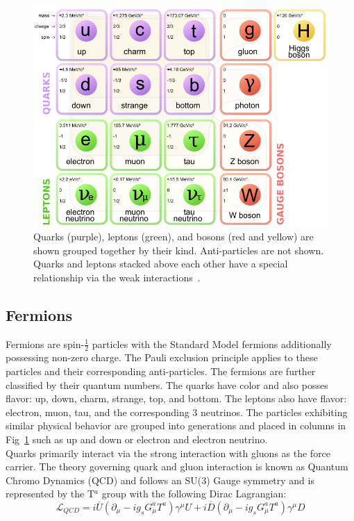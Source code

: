 \begin{figure}[h]
\begin{center}
\includegraphics[width=0.8\linewidth]{Figs/Table_of_SM_particles.png}
\caption{\label{fig:standard_particles}
Quarks (purple), leptons (green), and bosons (red and yellow) are shown grouped together by their kind. Anti-particles are not shown. Quarks and leptons stacked above each other have a special relationship via the weak interactions~\cite{wikiparticles}.
}
\end{center}
\end{figure} 

\subsection{Fermions}
Fermions are spin-$\frac{1}{2}$ particles with the Standard Model fermions additionally possessing non-zero charge. The Pauli exclusion principle applies to these particles and their corresponding anti-particles. The fermions are further classified by their quantum numbers. The quarks have color and also posses flavor: up, down, charm, strange, top, and bottom. The leptons also have flavor: electron, muon, tau, and the corresponding 3 neutrinos. The particles exhibiting similar physical behavior are grouped into generations and placed in columns in Fig~\ref{fig:standard_particles} such as up and down or electron and electron neutrino.\\

Quarks primarily interact via the strong interaction with gluons as the force carrier. The theory governing quark and gluon interaction is known as Quantum Chromo Dynamics (QCD) and follows an SU(3) Gauge symmetry and is represented by the T$^a$ group with the following Dirac Lagrangian:
\begin{equation}
\mathcal{L}_{QCD}=i\overline{U}(\partial_\mu - i g_s G^a_\mu T^a)\gamma^\mu U + i\overline{D}(\partial_\mu - i g_s G^a_\mu T^a ) \gamma^\mu D
\end{equation}


